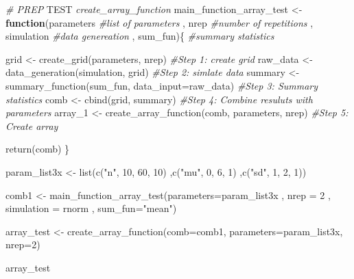 \documentclass[11pt,a4paper]{article}
\newenvironment{Shaded}{\begin{snugshade}}{\end{snugshade}}
\newcommand{\AlertTok}[1]{\textcolor[rgb]{0.94,0.16,0.16}{#1}}
\newcommand{\AttributeTok}[1]{\textcolor[rgb]{0.77,0.63,0.00}{#1}}
\newcommand{\CommentTok}[1]{\textcolor[rgb]{0.56,0.35,0.01}{\textit{#1}}}
\newcommand{\ControlFlowTok}[1]{\textcolor[rgb]{0.13,0.29,0.53}{\textbf{#1}}}
\newcommand{\DecValTok}[1]{\textcolor[rgb]{0.00,0.00,0.81}{#1}}
\newcommand{\FunctionTok}[1]{\textcolor[rgb]{0.00,0.00,0.00}{#1}}
\newcommand{\NormalTok}[1]{#1}
\newcommand{\OtherTok}[1]{\textcolor[rgb]{0.56,0.35,0.01}{#1}}
\newcommand{\StringTok}[1]{\textcolor[rgb]{0.31,0.60,0.02}{#1}}
\begin{document}
\begin{Shaded}
\begin{Highlighting}[]
\CommentTok{\# PREP }\AlertTok{TEST}\CommentTok{ \textasciigrave{}create\_array\_function\textasciigrave{}}
\NormalTok{main\_function\_array\_test }\OtherTok{\textless{}{-}}  \ControlFlowTok{function}\NormalTok{(parameters }\CommentTok{\#list of parameters}
\NormalTok{                                      , nrep }\CommentTok{\#number of repetitions}
\NormalTok{                                      , simulation }\CommentTok{\#data genereation}
\NormalTok{                                      , sum\_fun)\{ }\CommentTok{\#summary statistics}
  
\NormalTok{  grid }\OtherTok{\textless{}{-}} \FunctionTok{create\_grid}\NormalTok{(parameters, nrep) }\CommentTok{\#Step 1: create grid}
\NormalTok{  raw\_data }\OtherTok{\textless{}{-}} \FunctionTok{data\_generation}\NormalTok{(simulation, grid) }\CommentTok{\#Step 2: simlate data}
\NormalTok{  summary }\OtherTok{\textless{}{-}} \FunctionTok{summary\_function}\NormalTok{(sum\_fun, }\AttributeTok{data\_input=}\NormalTok{raw\_data) }\CommentTok{\#Step 3: Summary statistics}
\NormalTok{  comb }\OtherTok{\textless{}{-}} \FunctionTok{cbind}\NormalTok{(grid, summary) }\CommentTok{\#Step 4: Combine resuluts with parameters}
\NormalTok{  array\_1 }\OtherTok{\textless{}{-}} \FunctionTok{create\_array\_function}\NormalTok{(comb, parameters, nrep) }\CommentTok{\#Step 5: Create array}
  
  \FunctionTok{return}\NormalTok{(comb)}
\NormalTok{\}}





\NormalTok{param\_list3x }\OtherTok{\textless{}{-}} \FunctionTok{list}\NormalTok{(}\FunctionTok{c}\NormalTok{(}\StringTok{"n"}\NormalTok{, }\DecValTok{10}\NormalTok{, }\DecValTok{60}\NormalTok{, }\DecValTok{10}\NormalTok{)}
\NormalTok{                     ,}\FunctionTok{c}\NormalTok{(}\StringTok{"mu"}\NormalTok{, }\DecValTok{0}\NormalTok{, }\DecValTok{6}\NormalTok{, }\DecValTok{1}\NormalTok{)}
\NormalTok{                     ,}\FunctionTok{c}\NormalTok{(}\StringTok{"sd"}\NormalTok{, }\DecValTok{1}\NormalTok{, }\DecValTok{2}\NormalTok{, }\DecValTok{1}\NormalTok{))}

\NormalTok{comb1 }\OtherTok{\textless{}{-}} \FunctionTok{main\_function\_array\_test}\NormalTok{(}\AttributeTok{parameters=}\NormalTok{param\_list3x}
\NormalTok{                                  , }\AttributeTok{nrep =} \DecValTok{2}
\NormalTok{                                  , }\AttributeTok{simulation =}\NormalTok{ rnorm}
\NormalTok{                                  , }\AttributeTok{sum\_fun=}\StringTok{"mean"}\NormalTok{)}

\NormalTok{array\_test }\OtherTok{\textless{}{-}} \FunctionTok{create\_array\_function}\NormalTok{(}\AttributeTok{comb=}\NormalTok{comb1, }\AttributeTok{parameters=}\NormalTok{param\_list3x, }\AttributeTok{nrep=}\DecValTok{2}\NormalTok{)}

\NormalTok{array\_test}
\end{Highlighting}
\end{Shaded}
\end{document}
